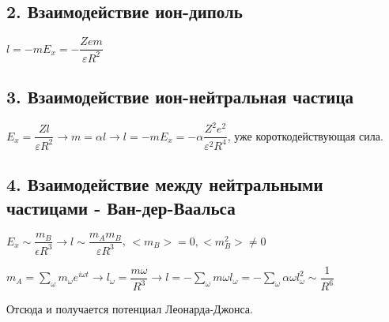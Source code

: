 \begin{lecture}
\begin{lecSection}
		\subsection{2. Взаимодействие ион-диполь}
		
		$l = -mE_x = - \dfrac{Zem}{\varepsilon R^2}$
		
		\subsection{3. Взаимодействие ион-нейтральная частица}
		
		$E_x = \dfrac{Zl}{\varepsilon R^2} \rightarrow m = \alpha l \rightarrow l = -m E_x = - \alpha \dfrac{Z^2e^2}{\varepsilon^2 R^4}$, уже короткодействующая сила.
		
		\subsection{4. Взаимодействие между нейтральными частицами - Ван-дер-Ваальса}
		
		$E_x \sim \dfrac{m_B}{\epsilon R^3} \rightarrow l \sim \dfrac{m_Am_B}{\varepsilon R^3}$, $<m_B> = 0, <m_B^2> \neq 0$
		\par $m_A = \sum\limits_{\omega} m_{\omega} e^{i\omega t} \rightarrow l_{\omega} = \dfrac{m \omega}{R^3} \rightarrow l = -\sum\limits_{\omega}m\omega l_{\omega} = -\sum\limits_{\omega} \alpha \omega l_{\omega}^2 \sim \dfrac{1}{R^6}$
		\par Отсюда и получается потенциал Леонарда-Джонса.
				
	\end{lecSection}		
\end{lecture}